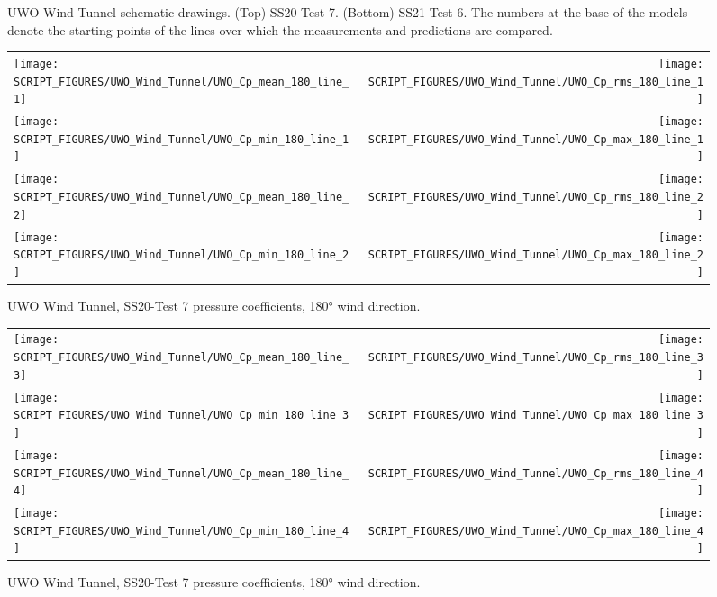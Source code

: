 \begin{figure}[!ht]
\caption[UWO Wind Tunnel schematic drawings]{UWO Wind Tunnel schematic drawings. (Top) SS20-Test 7. (Bottom) SS21-Test 6. The numbers at the base of the models denote the starting points of the lines over which the measurements and predictions are compared.}
\label{UWO_Drawings}
\end{figure}

\begin{figure}[p]
\begin{tabular*}{\textwidth}{l@{\extracolsep{\fill}}r}
\texttt{[image: SCRIPT\_FIGURES/UWO\_Wind\_Tunnel/UWO\_Cp\_mean\_180\_line\_1]} &
\texttt{[image: SCRIPT\_FIGURES/UWO\_Wind\_Tunnel/UWO\_Cp\_rms\_180\_line\_1]} \\
\texttt{[image: SCRIPT\_FIGURES/UWO\_Wind\_Tunnel/UWO\_Cp\_min\_180\_line\_1]} &
\texttt{[image: SCRIPT\_FIGURES/UWO\_Wind\_Tunnel/UWO\_Cp\_max\_180\_line\_1]} \\
\texttt{[image: SCRIPT\_FIGURES/UWO\_Wind\_Tunnel/UWO\_Cp\_mean\_180\_line\_2]} &
\texttt{[image: SCRIPT\_FIGURES/UWO\_Wind\_Tunnel/UWO\_Cp\_rms\_180\_line\_2]} \\
\texttt{[image: SCRIPT\_FIGURES/UWO\_Wind\_Tunnel/UWO\_Cp\_min\_180\_line\_2]} &
\texttt{[image: SCRIPT\_FIGURES/UWO\_Wind\_Tunnel/UWO\_Cp\_max\_180\_line\_2]}
\end{tabular*}
\caption[UWO Wind Tunnel, SS20-Test 7 pressure coefficients, 180\si{\degree}]{UWO Wind Tunnel, SS20-Test 7 pressure coefficients, 180\si{\degree} wind direction.}
\label{UWO_Test_7_pressure_coefficients_180_1}
\end{figure}

\begin{figure}[p]
\begin{tabular*}{\textwidth}{l@{\extracolsep{\fill}}r}
\texttt{[image: SCRIPT\_FIGURES/UWO\_Wind\_Tunnel/UWO\_Cp\_mean\_180\_line\_3]} &
\texttt{[image: SCRIPT\_FIGURES/UWO\_Wind\_Tunnel/UWO\_Cp\_rms\_180\_line\_3]} \\
\texttt{[image: SCRIPT\_FIGURES/UWO\_Wind\_Tunnel/UWO\_Cp\_min\_180\_line\_3]} &
\texttt{[image: SCRIPT\_FIGURES/UWO\_Wind\_Tunnel/UWO\_Cp\_max\_180\_line\_3]} \\
\texttt{[image: SCRIPT\_FIGURES/UWO\_Wind\_Tunnel/UWO\_Cp\_mean\_180\_line\_4]} &
\texttt{[image: SCRIPT\_FIGURES/UWO\_Wind\_Tunnel/UWO\_Cp\_rms\_180\_line\_4]}  \\
\texttt{[image: SCRIPT\_FIGURES/UWO\_Wind\_Tunnel/UWO\_Cp\_min\_180\_line\_4]} &
\texttt{[image: SCRIPT\_FIGURES/UWO\_Wind\_Tunnel/UWO\_Cp\_max\_180\_line\_4]}
\end{tabular*}
\caption[UWO Wind Tunnel, SS20-Test 7 pressure coefficients, 180\si{\degree}]{UWO Wind Tunnel, SS20-Test 7 pressure coefficients, 180\si{\degree} wind direction.}
\label{UWO_Test_7_pressure_coefficients_180_2}
\end{figure}

